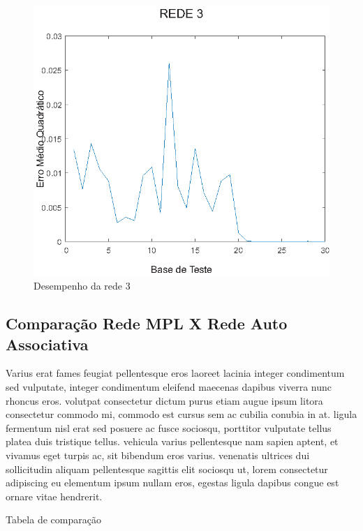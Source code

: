 \begin{figure}[h!]

\centering %
\includegraphics{04-Figuras/MSE_DesempenhoNet3}

\caption{Desempenho da rede 3}

\label{figura:rede3}

\end{figure}



\subsection{Comparação Rede MPL X Rede Auto Associativa}

Varius erat fames feugiat pellentesque eros laoreet lacinia integer condimentum sed vulputate, integer condimentum eleifend maecenas dapibus viverra nunc rhoncus eros. volutpat consectetur dictum purus etiam augue ipsum litora consectetur commodo mi, commodo est cursus sem ac cubilia conubia in at. ligula fermentum nisl erat sed posuere ac fusce sociosqu, porttitor vulputate tellus platea duis tristique tellus. vehicula varius pellentesque nam sapien aptent, et vivamus eget turpis ac, sit bibendum eros varius. venenatis ultrices dui sollicitudin aliquam pellentesque sagittis elit sociosqu ut, lorem consectetur adipiscing eu elementum ipsum nullam eros, egestas ligula dapibus congue est ornare vitae hendrerit.

Tabela de comparação